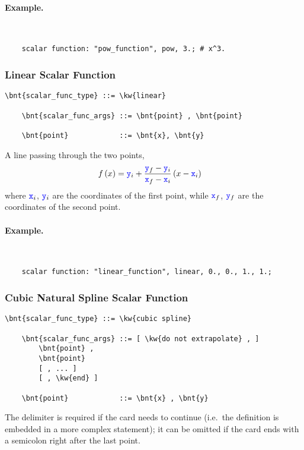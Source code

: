 \paragraph{Example.} \
\begin{verbatim}
    scalar function: "pow_function", pow, 3.; # x^3.
\end{verbatim}

\subsubsection{Linear Scalar Function}
\begin{Verbatim}[commandchars=\\\{\}]
    \bnt{scalar_func_type} ::= \kw{linear}

    \bnt{scalar_func_args} ::= \bnt{point} , \bnt{point}

    \bnt{point}            ::= \bnt{x}, \bnt{y}
\end{Verbatim}
A line passing through the two points,
\begin{align}
	f\left( x \right)
	&=
	\textcolor{blue}{\texttt{y}}_i
	+
	\frac{\textcolor{blue}{\texttt{y}}_f - \textcolor{blue}{\texttt{y}}_i}{\textcolor{blue}{\texttt{x}}_f - \textcolor{blue}{\texttt{x}}_i} \left( x - \textcolor{blue}{\texttt{x}}_i \right)
\end{align}
where $\textcolor{blue}{\texttt{x}}_i$, $\textcolor{blue}{\texttt{y}}_i$ are the coordinates of the first point,
while $\textcolor{blue}{\texttt{x}}_f$, $\textcolor{blue}{\texttt{y}}_f$ are the coordinates of the second point.

\paragraph{Example.} \
\begin{verbatim}
    scalar function: "linear_function", linear, 0., 0., 1., 1.;
\end{verbatim}

\subsubsection{Cubic Natural Spline Scalar Function}
\begin{Verbatim}[commandchars=\\\{\}]
    \bnt{scalar_func_type} ::= \kw{cubic spline}

    \bnt{scalar_func_args} ::= [ \kw{do not extrapolate} , ]
        \bnt{point} , 
        \bnt{point}
        [ , ... ]
        [ , \kw{end} ]

    \bnt{point}            ::= \bnt{x} , \bnt{y}
\end{Verbatim}
The  delimiter is required if the card needs to continue
(i.e.\ the  definition is embedded in a more complex
statement); it can be omitted if the card ends with a semicolon
right after the last point.

